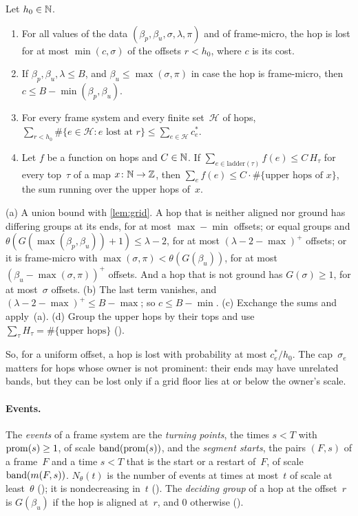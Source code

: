 \begin{lemma}\label{lem:cost}
Let $h_0\in\mathbb{N}$.
\begin{enumerate}[label=(\alph*)]
\item For all values of the data $(\beta_p,\beta_u,\sigma,\lambda,\pi)$ and of frame-micro, the hop is lost for at most
$\min(c,\sigma)$ of the offsets $r<h_0$, where $c$ is its cost.
\item If $\beta_p,\beta_u,\lambda\le B$, and $\beta_u\le\max(\sigma,\pi)$ in case the hop is frame-micro, then
$c\le B-\min(\beta_p,\beta_u)$.
\item For every frame system and every finite set~$\mathcal H$ of hops,
$\sum_{r<h_0}\#\{e\in\mathcal H:e\text{ lost at }r\}\le\sum_{e\in\mathcal H}c^*_e$.
\item Let $f$ be a function on hops and $C\in\mathbb{N}$. If $\sum_{e\in\text{ladder}(\tau)}f(e)\le C\,H_\tau$ for every top~$\tau$ of a
map $x\colon\mathbb{N}\to\mathbb{Z}$, then $\sum_ef(e)\le C\cdot\#\{\text{upper hops of }x\}$, the sum running over the upper hops of~$x$.
\end{enumerate}
\end{lemma}

\begin{outline}
(a) A union bound with \cref{lem:grid}. A hop that is neither aligned nor ground has differing groups at its ends, for at most
$\max-\min$ offsets; or equal groups and $\theta(G(\max(\beta_p,\beta_u))+1)\le\lambda-2$, for at most $(\lambda-2-\max)^+$
offsets; or it is frame-micro with $\max(\sigma,\pi)<\theta(G(\beta_u))$, for at most $(\beta_u-\max(\sigma,\pi))^+$ offsets.
And a hop that is not ground has $G(\sigma)\ge1$, for at most~$\sigma$ offsets. (b) The last term vanishes, and
$(\lambda-2-\max)^+\le B-\max$; so $c\le B-\min$. (c) Exchange the sums and apply~(a). (d) Group the upper hops by their tops
and use $\sum_\tau H_\tau=\#\{\text{upper hops}\}$ ().
\end{outline}

So, for a uniform offset, a hop is lost with probability at most $c^*_e/h_0$. The cap~$\sigma_e$ matters for hops whose owner is
not prominent: their ends may have unrelated bands, but they can be lost only if a grid floor lies at or below the owner's scale.

\paragraph{Events.} The \emph{events} of a frame system are the \emph{turning points}, the times $s<T$ with $\operatorname{prom}(s)\ge1$, of
scale $\operatorname{band}(\operatorname{prom}(s))$, and the \emph{segment starts}, the pairs $(F,s)$ of a frame~$F$ and a time $s<T$ that is the start or a
restart of~$F$, of scale $\operatorname{band}(m(F,s))$. $N_\theta(t)$ is the number of events at times at most~$t$ of scale at least~$\theta$
(); it is nondecreasing in~$t$ (). The \emph{deciding group} of a hop at the offset~$r$
is $G(\beta_u)$ if the hop is aligned at~$r$, and $0$ otherwise ().

